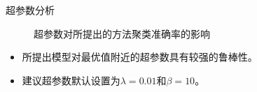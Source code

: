 \documentclass{beamer}
\begin{document}
\begin{frame}{超参数分析}
    \vspace{-0.5cm}
    \begin{figure}[!t]
		\caption{超参数对所提出的方法聚类准确率的影响}
		\label{fig_3}
	\end{figure}
	
	\begin{itemize}
	    \item 所提出模型对最优值附近的超参数具有较强的鲁棒性。
	    \item 建议超参数默认设置为$\lambda\!=\!0.01$和$\beta\!=\!10$。
	\end{itemize}
\end{frame}
\end{document}
